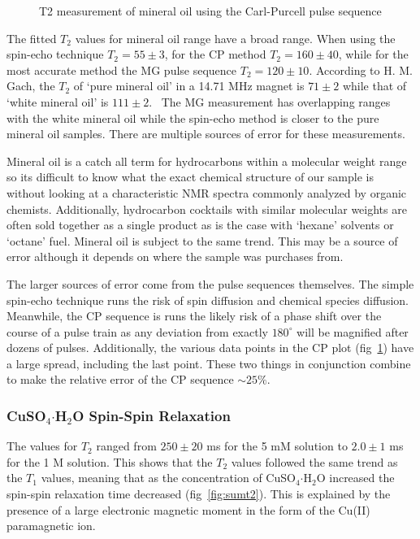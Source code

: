 \documentclass[
reprint,
amsmath,amssymb,
aps,
tikz,
border=5pt
]{revtex4-1}
\newcommand*{\cuso}[1][]{CuSO$_{4} \boldsymbol{\cdot} $H$_2$O }
\newcommand*{\tc}[1][1]{$T_#1$ }
\newcommand*{\tg}[1][2]{$T_#1$ }
\begin{document}
    \begin{figure}[b]
        \resizebox{0.45\textwidth}{!}{}
        \caption{T2 measurement of mineral oil using the Carl-Purcell pulse sequence }
        \label{fig:mo_cp}
    \end{figure}
    
    The fitted \tc[2] values for mineral oil range have a broad range. When using the spin-echo technique $T_2 = 55 \pm 3$, for the CP method $T_2 = 160 \pm 40 $, while for the most accurate method the MG pulse sequence $T_2 = 120 \pm 10 $. According to H. M. Gach, the \tc[2] of `pure mineral oil' in a 14.71 MHz magnet is $71 \pm 2$ while that of `white mineral oil' is $111 \pm 2 $.~\cite{medphys} The MG measurement has overlapping ranges with the white mineral oil while the spin-echo method is closer to the pure mineral oil samples. There are multiple sources of error for these measurements.
    



    Mineral oil is a catch all term for hydrocarbons within a molecular weight range so its difficult to know what the exact chemical structure of our sample is without looking at a characteristic NMR spectra commonly analyzed by organic chemists. Additionally, hydrocarbon cocktails with similar molecular weights are often sold together as a single product as is the case with `hexane' solvents or `octane' fuel. Mineral oil is subject to the same trend. This may be a source of error although it depends on where the sample was purchases from.




      The larger sources of error come from the pulse sequences themselves. The simple spin-echo technique runs the risk of spin diffusion and chemical species diffusion. Meanwhile, the CP sequence is runs the likely risk of a phase shift over the course of a pulse train as any deviation from exactly $180^\circ$ will be magnified after dozens of pulses. Additionally, the various data points in the CP plot (fig~\ref{fig:mo_cp}) have a large spread, including the last point. These two things in conjunction combine to make the relative error of the CP sequence $\sim 25\%$. 

\subsubsection*{\cuso Spin-Spin Relaxation}

      The values for \tc[2] ranged from $250 \pm 20$ ms for the 5 mM solution to $2.0 \pm 1$ ms for the 1 M solution. This shows that the \tg values followed the same trend as the \tc values, meaning that as the concentration of \cuso increased the spin-spin relaxation time decreased (fig~\ref{fig:sumt2}). This is explained by the presence of a large electronic magnetic moment in the form of the Cu(II) paramagnetic ion.  
\end{document}
